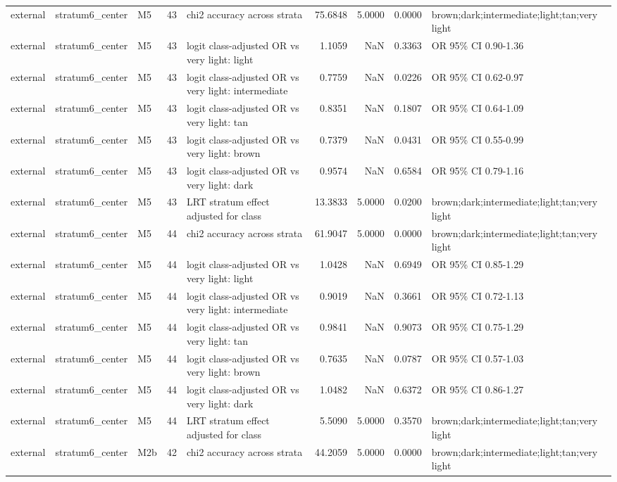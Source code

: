 \begin{tabular}{lllrlrrrl}
external & stratum6\_center & M5 & 43 & chi2 accuracy across strata & 75.6848 & 5.0000 & 0.0000 & brown;dark;intermediate;light;tan;very light \\
external & stratum6\_center & M5 & 43 & logit class-adjusted OR vs very light: light & 1.1059 & NaN & 0.3363 & OR 95\% CI 0.90-1.36 \\
external & stratum6\_center & M5 & 43 & logit class-adjusted OR vs very light: intermediate & 0.7759 & NaN & 0.0226 & OR 95\% CI 0.62-0.97 \\
external & stratum6\_center & M5 & 43 & logit class-adjusted OR vs very light: tan & 0.8351 & NaN & 0.1807 & OR 95\% CI 0.64-1.09 \\
external & stratum6\_center & M5 & 43 & logit class-adjusted OR vs very light: brown & 0.7379 & NaN & 0.0431 & OR 95\% CI 0.55-0.99 \\
external & stratum6\_center & M5 & 43 & logit class-adjusted OR vs very light: dark & 0.9574 & NaN & 0.6584 & OR 95\% CI 0.79-1.16 \\
external & stratum6\_center & M5 & 43 & LRT stratum effect adjusted for class & 13.3833 & 5.0000 & 0.0200 & brown;dark;intermediate;light;tan;very light \\
external & stratum6\_center & M5 & 44 & chi2 accuracy across strata & 61.9047 & 5.0000 & 0.0000 & brown;dark;intermediate;light;tan;very light \\
external & stratum6\_center & M5 & 44 & logit class-adjusted OR vs very light: light & 1.0428 & NaN & 0.6949 & OR 95\% CI 0.85-1.29 \\
external & stratum6\_center & M5 & 44 & logit class-adjusted OR vs very light: intermediate & 0.9019 & NaN & 0.3661 & OR 95\% CI 0.72-1.13 \\
external & stratum6\_center & M5 & 44 & logit class-adjusted OR vs very light: tan & 0.9841 & NaN & 0.9073 & OR 95\% CI 0.75-1.29 \\
external & stratum6\_center & M5 & 44 & logit class-adjusted OR vs very light: brown & 0.7635 & NaN & 0.0787 & OR 95\% CI 0.57-1.03 \\
external & stratum6\_center & M5 & 44 & logit class-adjusted OR vs very light: dark & 1.0482 & NaN & 0.6372 & OR 95\% CI 0.86-1.27 \\
external & stratum6\_center & M5 & 44 & LRT stratum effect adjusted for class & 5.5090 & 5.0000 & 0.3570 & brown;dark;intermediate;light;tan;very light \\
external & stratum6\_center & M2b & 42 & chi2 accuracy across strata & 44.2059 & 5.0000 & 0.0000 & brown;dark;intermediate;light;tan;very light \\

\end{tabular}
